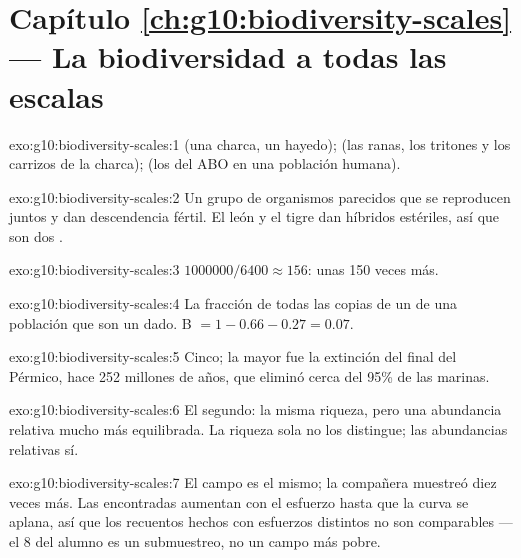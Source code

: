 \section*{Capítulo \ref{ch:g10:biodiversity-scales} --- La biodiversidad a todas las escalas}

\begin{solution}{exo:g10:biodiversity-scales:1}
 (una charca, un hayedo);  (las ranas, los tritones
y los carrizos de la charca);  (los  del  ABO en una
población humana).
\end{solution}

\begin{solution}{exo:g10:biodiversity-scales:2}
Un grupo de organismos parecidos que se reproducen juntos y dan
descendencia fértil. El león y el tigre dan híbridos estériles, así que
son dos .
\end{solution}

\begin{solution}{exo:g10:biodiversity-scales:3}
$\num{1000000}/6400 \approx 156$: unas 150 veces más.
\end{solution}

\begin{solution}{exo:g10:biodiversity-scales:4}
La fracción de todas las copias de un  de una población que son un
 dado. B $= 1 - 0.66 - 0.27 = 0.07$.
\end{solution}

\begin{solution}{exo:g10:biodiversity-scales:5}
Cinco; la mayor fue la extinción del final del Pérmico, hace 252
millones de años, que eliminó cerca del 95\% de las  marinas.
\end{solution}

\begin{solution}{exo:g10:biodiversity-scales:6}
El segundo: la misma riqueza, pero una abundancia relativa mucho más
equilibrada. La riqueza sola no los distingue; las abundancias
relativas sí.
\end{solution}

\begin{solution}{exo:g10:biodiversity-scales:7}
El campo es el mismo; la compañera muestreó diez veces más. Las
 encontradas aumentan con el esfuerzo hasta que la curva se
aplana, así que los recuentos hechos con esfuerzos distintos no son
comparables --- el 8 del alumno es un submuestreo, no un campo más
pobre.
\end{solution}

